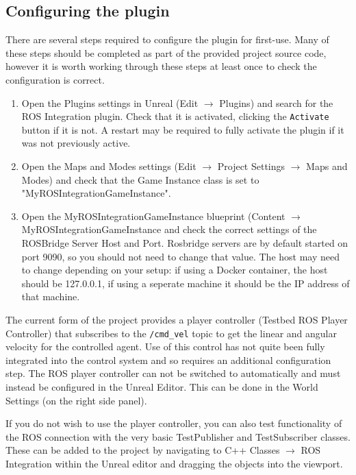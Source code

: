 \documentclass[../main.tex]{subfiles}
\begin{document}
\subsection{Configuring the plugin} \label{sec:plugin_config}
There are several steps required to configure the plugin for first-use. Many of these steps should be completed as part of the provided project source code, however it is worth working through these steps at least once to check the configuration is correct.
\begin{enumerate}
    \item Open the Plugins settings in Unreal (Edit \( \rightarrow \) Plugins) and search for the ROS Integration plugin. Check that it is activated, clicking the \verb|Activate| button if it is not. A restart may be required to fully activate the plugin if it was not previously active.
    \item Open the Maps and Modes settings (Edit \( \rightarrow \) Project Settings \( \rightarrow \) Maps and Modes) and check that the Game Instance class is set to "MyROSIntegrationGameInstance".
    \item Open the MyROSIntegrationGameInstance blueprint (Content \( \rightarrow \) MyROSIntegrationGameInstance and check the correct settings of the ROSBridge Server Host and Port. Rosbridge servers are by default started on port 9090, so you should not need to change that value. The host may need to change depending on your setup: if using a Docker container, the host should be 127.0.0.1, if using a seperate machine it should be the IP address of that machine.
\end{enumerate}

The current form of the project provides a player controller (Testbed ROS Player Controller) that subscribes to the \texttt{/cmd\_vel} topic to get the linear and angular velocity for the controlled agent. Use of this control has not quite been fully integrated into the control system and so requires an additional configuration step. The ROS player controller can not be switched to automatically and must instead be configured in the Unreal Editor. This can be done in the World Settings (on the right side panel). 

If you do not wish to use the player controller, you can also test functionality of the ROS connection with the very basic TestPublisher and TestSubscriber classes. These can be added to the project by navigating to C++ Classes \( \rightarrow \) ROS Integration within the Unreal editor and dragging the objects into the viewport.
\end{document}
